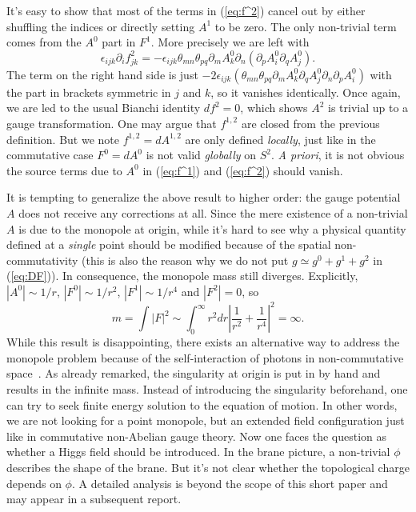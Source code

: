 \documentclass[a4paper,12pt]{article}
\begin{document}
\vskip -0.5cm
\noindent It's easy to show that most of the terms in (\ref{eq:f^2}) cancel
out by either shuf\mbox{}f\mbox{}ling the indices or directly 
setting $A^1$ to be zero.
The only non-trivial term comes from the $A^0$ part in $F^1$. More precisely
we are left with
\begin{equation}
\epsilon_{ijk}\partial_i f^2_{jk}=-\epsilon_{ijk}\theta_{mn}\theta_{pq}
            \partial_m A^0_k\partial_n (\partial_p A^0_i\partial_q A^0_j).
\end{equation} 
The term on the right hand side is just $-2\epsilon_{ijk}(\theta_{mn}
                  \theta_{pq}\partial_m A^0_k\partial_q A^0_j
                  \partial_n \partial_p A^0_i)$ with the part in brackets
symmetric in $j$ and $k$, so it vanishes identically. Once again, we are
led to the usual Bianchi identity $d f^2=0$, which shows $A^2$ is trivial
up to a gauge transformation. 
One may argue that $f^{1, 2}$ are closed from the previous def\mbox{}inition.
But we note $f^{1, 2}=dA^{1, 2}$ are only def\mbox{}ined \emph{locally},
just like in the commutative case $F^0=dA^0$ is not valid \emph{globally}
on $S^2$. {\it A priori}, it is not obvious the source terms due to $A^0$ in
(\ref{eq:f^1}) and (\ref{eq:f^2}) should vanish.

It is tempting to generalize the above result to higher order: the gauge
potential $A$ does not receive any corrections at all. Since the mere 
existence of a non-trivial $A$ is due to the monopole at origin, while it's
hard to see why a physical quantity def\mbox{}ined at a \emph{single} point
should be modif\mbox{}ied because of the spatial non-commutativity (this
is also the reason why we do not put $g\simeq g^0+g^1+g^2$ in (\ref{eq:DF})).
In consequence, the monopole mass still diverges. Explicitly, $|A^0|\sim 1/r$,
$|F^0|\sim 1/r^2$, $|F^1|\sim 1/r^4$ and $|F^2|=0$, so
\begin{equation}
m=\int |F|^2 \sim \int_0^{\infty} r^2dr\left| \frac{1}{r^2}+\frac{1}{r^4}
     \right|^2=\infty.
\end{equation}
While this result is disappointing, there exists an alternative way to 
address the monopole problem because of the self-interaction of photons
in non-commutative space~\cite{mh}. As already remarked, the singularity 
at origin is put in by hand and results
in the inf\mbox{}inite mass. Instead of introducing the singularity beforehand,
one can try to seek f\mbox{}inite energy solution to the equation of motion.
In other words, we are not looking for a point monopole, but an extended
f\mbox{}ield conf\mbox{}iguration just like in commutative non-Abelian
gauge theory. Now one faces the question as whether a Higgs f\mbox{}ield
should be introduced. In the brane picture, a non-trivial $\phi$ describes
the shape of the brane. But it's not clear whether the topological
charge depends on $\phi$. A detailed analysis is beyond the scope of this
short paper and may appear in a subsequent report.
\end{document}
